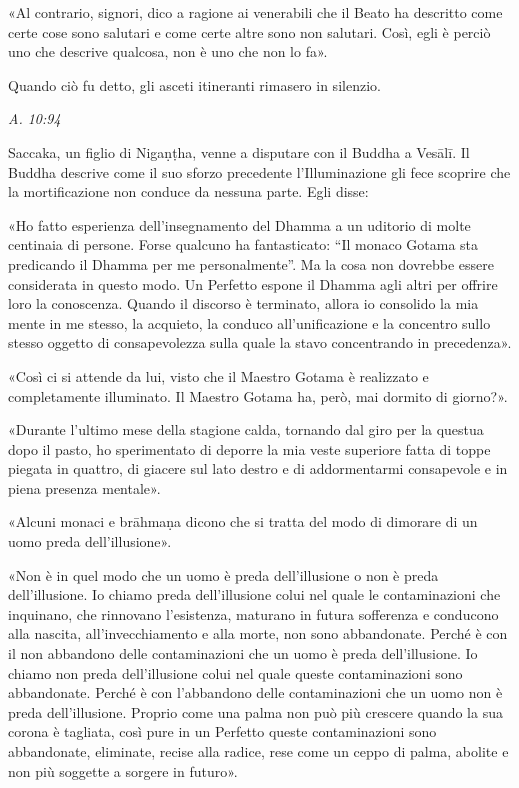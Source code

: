 «Al contrario, signori, dico a ragione ai venerabili che il Beato ha
descritto come certe cose sono salutari e come certe altre sono non
salutari. Così, egli è perciò uno che descrive qualcosa, non è uno che
non lo fa».


Quando ciò fu detto, gli asceti itineranti rimasero in silenzio.


\emph{A. 10:94}


 Saccaka, un figlio di Nigaṇṭha, venne a disputare con
il Buddha a Vesālī. Il Buddha descrive come il suo sforzo precedente
l’Illuminazione gli fece scoprire che la mortificazione non conduce da
nessuna parte. Egli disse:


 «Ho fatto esperienza dell’insegnamento del Dhamma a
un uditorio di molte centinaia di persone. Forse qualcuno ha
fantasticato: “Il monaco Gotama sta predicando il Dhamma per me
personalmente”. Ma la cosa non dovrebbe essere considerata in questo
modo. Un Perfetto espone il Dhamma agli altri per offrire loro la
conoscenza. Quando il discorso è terminato, allora io consolido la mia
mente in me stesso, la acquieto, la conduco all’unificazione e la
concentro sullo stesso oggetto di consapevolezza sulla quale la stavo
concentrando in precedenza».


«Così ci si attende da lui, visto che il Maestro Gotama è realizzato e
completamente illuminato. Il Maestro Gotama ha, però, mai dormito di
giorno?».


«Durante l’ultimo mese della stagione calda, tornando dal giro per la
questua dopo il pasto, ho sperimentato di deporre la mia veste superiore
fatta di toppe piegata in quattro, di giacere sul lato destro e di
addormentarmi consapevole e in piena presenza mentale».


«Alcuni monaci e brāhmaṇa dicono che si tratta del modo di dimorare di
un uomo preda dell’illusione».


«Non è in quel modo che un uomo è preda dell’illusione o non è preda
dell’illusione. Io chiamo preda dell’illusione colui nel quale le
contaminazioni che inquinano, che rinnovano l’esistenza, maturano in
futura sofferenza e conducono alla nascita, all’invecchiamento e alla
morte, non sono abbandonate. Perché è con il non abbandono delle
contaminazioni che un uomo è preda dell’illusione. Io chiamo non preda
dell’illusione colui nel quale queste contaminazioni sono abbandonate.
Perché è con l’abbandono delle contaminazioni che un uomo non è preda
dell’illusione. Proprio come una palma non può più crescere quando la
sua corona è tagliata, così pure in un Perfetto queste contaminazioni
sono abbandonate, eliminate, recise alla radice, rese come un ceppo di
palma, abolite e non più soggette a sorgere in futuro».


